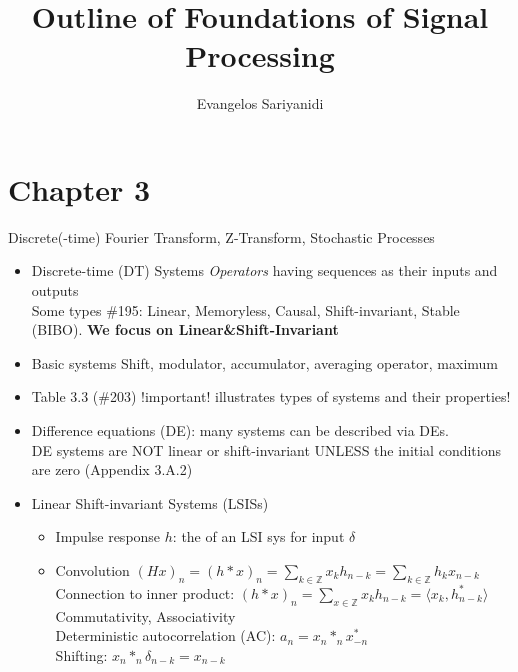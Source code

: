 \documentclass{article}
\newcommand{\la}{\langle}
\newcommand{\ra}{\rangle}
\newcommand{\cg}{\color{gray}}
\newcommand{\fs}{\footnotesize}
\begin{document}
\title{\bf Outline of Foundations of Signal Processing}
\author{Evangelos Sariyanidi}
\maketitle
\section*{Chapter 3}
Discrete(-time) Fourier Transform, Z-Transform, Stochastic Processes

\begin{itemize}

\item Discrete-time (DT) Systems {\cg \textit{Operators} having sequences as their inputs and outputs}\\
{\cg\fs Some types \#195: \color{gray} Linear, Memoryless, Causal, Shift-invariant, Stable (BIBO). {\bf We focus on Linear\&Shift-Invariant}}
\item Basic systems {\color{gray} Shift, modulator, accumulator, averaging operator, maximum}
\item Table 3.3 (\#203) !important! illustrates types of systems and their properties!
\item Difference equations (DE): many systems can be described via DEs. \\
{\color{gray} \footnotesize
DE systems are NOT linear or shift-invariant UNLESS the initial conditions are zero (Appendix 3.A.2)
}
\item Linear Shift-invariant Systems (LSISs)
\begin{itemize}
	\item Impulse response {\color{gray} $h$: the of an LSI sys for input $\delta$}
	\item Convolution {\color{gray} $(Hx)_n=(h\ast x)_n=\sum_{k\in\mathbb{Z}}x_kh_{n-k}=\sum_{k\in\mathbb{Z}}h_kx_{n-k}$} \\
	{\color{gray}\footnotesize
	Connection to inner product: $(h\ast x)_n=\sum_{x\in\mathbb{Z}}x_kh_{n-k}=\la x_k, h_{n-k}^{*} \ra$\\
	Commutativity, Associativity\\
	Deterministic autocorrelation (AC): $a_n = x_n\ast_n x^{*}_{-n}$ \\
	Shifting: $x_n\ast_n\delta_{n-k}=x_{n-k}$	\\
}
\end{itemize}
\end{itemize}
\end{document}
